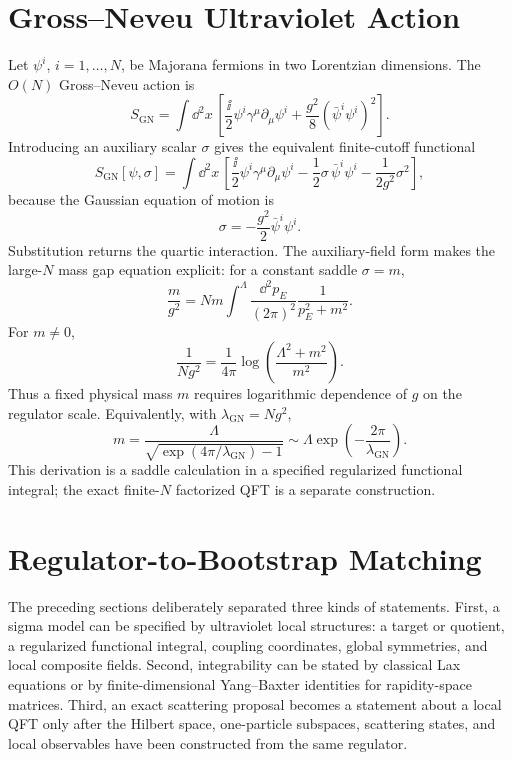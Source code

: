 \section{Gross--Neveu Ultraviolet Action}

Let \(\psi^i\), \(i=1,\ldots,N\), be Majorana fermions in two Lorentzian
dimensions.  The \(O(N)\) Gross--Neveu action is
\[
  S_{\mathrm{GN}}
  =
  \int\dd^2x\,
  \left[
    \frac{\ii}{2}\psi^i\gamma^\mu\partial_\mu\psi^i
    +\frac{g^2}{8}(\bar\psi^i\psi^i)^2
  \right].
\]
Introducing an auxiliary scalar \(\sigma\) gives the equivalent finite-cutoff
functional
\[
  S_{\mathrm{GN}}[\psi,\sigma]
  =
  \int\dd^2x\,
  \left[
    \frac{\ii}{2}\psi^i\gamma^\mu\partial_\mu\psi^i
    -\frac12\sigma\,\bar\psi^i\psi^i
    -\frac1{2g^2}\sigma^2
  \right],
\]
because the Gaussian equation of motion is
\[
  \sigma=-\frac{g^2}{2}\bar\psi^i\psi^i .
\]
Substitution returns the quartic interaction.  The auxiliary-field form makes
the large-\(N\) mass gap equation explicit: for a constant saddle
\(\sigma=m\),
\[
  \frac{m}{g^2}
  =
  Nm\int^\Lambda\frac{\dd^2p_E}{(2\pi)^2}\frac1{p_E^2+m^2}.
\]
For \(m\ne0\),
\[
  \frac1{Ng^2}
  =
  \frac1{4\pi}\log\!\left(\frac{\Lambda^2+m^2}{m^2}\right).
\]
Thus a fixed physical mass \(m\) requires logarithmic dependence of \(g\) on
the regulator scale.  Equivalently, with \(\lambda_{\mathrm{GN}}=Ng^2\),
\[
  m
  =
  \frac{\Lambda}{\sqrt{\exp(4\pi/\lambda_{\mathrm{GN}})-1}}
  \sim
  \Lambda\exp\!\left(-\frac{2\pi}{\lambda_{\mathrm{GN}}}\right).
\]
This derivation is a saddle calculation in a specified regularized functional
integral; the exact finite-\(N\) factorized QFT is a separate construction.

\section{Regulator-to-Bootstrap Matching}
\label{sec:sigma-model-regulator-bootstrap-matching}

The preceding sections deliberately separated three kinds of statements.
First, a sigma model can be specified by ultraviolet local structures: a target or
quotient, a regularized functional integral, coupling coordinates, global
symmetries, and local composite fields.  Second, integrability can be stated
by classical Lax equations or by finite-dimensional Yang--Baxter identities
for rapidity-space matrices.  Third, an exact scattering proposal becomes a
statement about a local QFT only after the Hilbert space, one-particle
subspaces, scattering states, and local observables have been constructed
from the same regulator.

